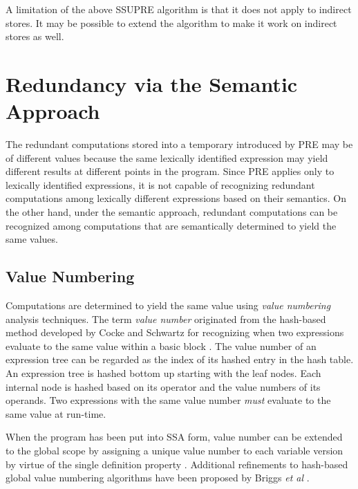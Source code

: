 A limitation of the above SSUPRE algorithm is that it does not apply to 
indirect stores.  It may be possible to extend the algorithm to make it
work on indirect stores as well.

\section{Redundancy via the Semantic Approach}
\label{section:Part3:Pre_not_helped:SemanticPRE}

The redundant computations stored into a temporary introduced by PRE may
be of different values because the same lexically identified expression may
yield different results at different points in the program.
Since PRE applies only to lexically identified expressions, it is not capable
of recognizing redundant computations among lexically different expressions
based on their semantics.  On the other hand, under the semantic approach, 
redundant computations can be recognized among computations that are 
semantically determined to yield the same values.

\subsection{Value Numbering}

Computations are determined to yield the same value using \emph{value numbering}
analysis techniques.  The term \emph{value number} originated from the 
hash-based method developed by Cocke and Schwartz for recognizing when two
expressions evaluate to the same value within a basic block \cite{CS70}.  
The value number of an expression tree can be regarded as the index of its
hashed entry in the hash table.  
An expression tree is hashed bottom up starting with the leaf nodes.  
Each internal node is hashed based on its operator and the value numbers of 
its operands.  Two expressions with the same
value number \emph{must} evaluate to the same value at run-time.

When the program has been put into SSA form, value number can be extended to the
global scope by assigning a unique value number to each variable version by
virtue of the single definition property \cite{Rosen88}.  Additional 
refinements to hash-based global value numbering algorithms have been proposed
by Briggs {\it et al} \cite{Briggs97}.

